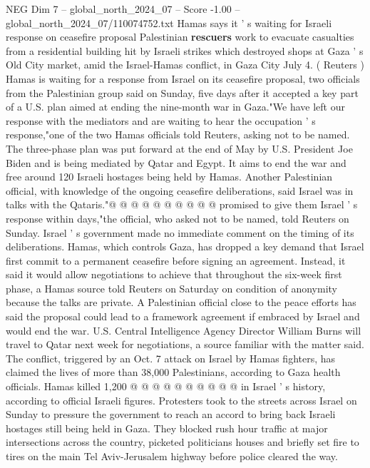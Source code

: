 \begin{textsample}{NEG Dim 7 – global\_north\_2024\_07 – Score -1.00 – global\_north\_2024\_07/110074752.txt}  \label{ex:f7_neg_414}
Hamas says it ' s waiting for Israeli response on ceasefire proposal Palestinian \textbf{rescuers} work to evacuate casualties from a residential building hit by Israeli strikes which destroyed shops at Gaza ' s Old City market, amid the Israel-Hamas conflict, in Gaza City July 4. ( Reuters ) Hamas is waiting for a response from Israel on its ceasefire proposal, two officials from the Palestinian group said on Sunday, five days after it accepted a key part of a U.S. plan aimed at ending the nine-month war in Gaza."We have left our response with the mediators and are waiting to hear the occupation ' s response,"one of the two Hamas officials told Reuters, asking not to be named.
The three-phase plan was put forward at the end of May by U.S.
President Joe Biden and is being mediated by Qatar and Egypt.
It aims to end the war and free around 120 Israeli hostages being held by Hamas.
Another Palestinian official, with knowledge of the ongoing ceasefire deliberations, said Israel was in talks with the Qataris."@ @ @ @ @ @ @ @ @ @ promised to give them Israel ' s response within days,"the official, who asked not to be named, told Reuters on Sunday.
Israel ' s government made no immediate comment on the timing of its deliberations.
Hamas, which controls Gaza, has dropped a key demand that Israel first commit to a permanent ceasefire before signing an agreement.
Instead, it said it would allow negotiations to achieve that throughout the six-week first phase, a Hamas source told Reuters on Saturday on condition of anonymity because the talks are private.
A Palestinian official close to the peace efforts has said the proposal could lead to a framework agreement if embraced by Israel and would end the war.
U.S.
Central Intelligence Agency Director William Burns will travel to Qatar next week for negotiations, a source familiar with the matter said.
The conflict, triggered by an Oct. 7 attack on Israel by Hamas fighters, has claimed the lives of more than 38,000 Palestinians, according to Gaza health officials.
Hamas killed 1,200 @ @ @ @ @ @ @ @ @ @ in Israel ' s history, according to official Israeli figures.
Protesters took to the streets across Israel on Sunday to pressure the government to reach an accord to bring back Israeli hostages still being held in Gaza.
They blocked rush hour traffic at major intersections across the country, picketed politicians houses and briefly set fire to tires on the main Tel Aviv-Jerusalem highway before police cleared the way.

\end{textsample}
